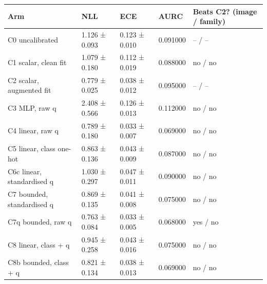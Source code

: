 \begin{tabular}{lllll}
\toprule
Arm & NLL & ECE & AURC & Beats C2? (image / family) \\
\midrule
C0 uncalibrated & 1.126 ± 0.093 & 0.123 ± 0.010 & 0.091000 & – / – \\
C1 scalar, clean fit & 1.079 ± 0.180 & 0.112 ± 0.019 & 0.088000 & no / no \\
C2 scalar, augmented fit & 0.779 ± 0.025 & 0.038 ± 0.012 & 0.095000 & – / – \\
C3 MLP, raw q & 2.408 ± 0.566 & 0.126 ± 0.013 & 0.112000 & no / no \\
C4 linear, raw q & 0.789 ± 0.180 & 0.033 ± 0.007 & 0.069000 & no / no \\
C5 linear, class one-hot & 0.863 ± 0.136 & 0.043 ± 0.009 & 0.087000 & no / no \\
C6c linear, standardised q & 1.030 ± 0.297 & 0.047 ± 0.011 & 0.090000 & no / no \\
C7 bounded, standardised q & 0.869 ± 0.135 & 0.041 ± 0.008 & 0.075000 & no / no \\
C7q bounded, raw q & 0.763 ± 0.084 & 0.033 ± 0.005 & 0.068000 & yes / no \\
C8 linear, class + q & 0.945 ± 0.258 & 0.043 ± 0.016 & 0.075000 & no / no \\
C8b bounded, class + q & 0.821 ± 0.134 & 0.038 ± 0.013 & 0.069000 & no / no \\
\bottomrule
\end{tabular}
